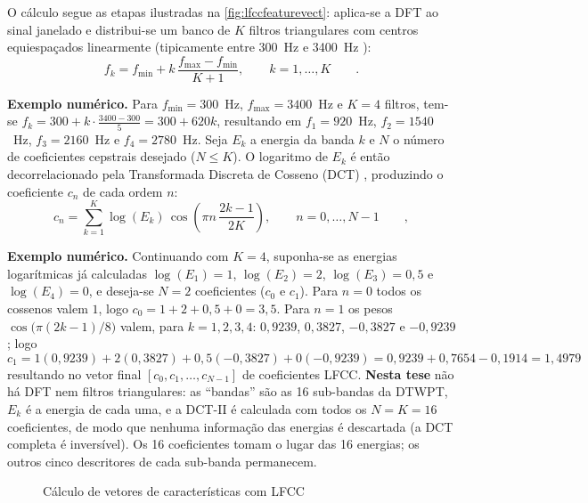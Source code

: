 			\par O cálculo segue as etapas ilustradas na \autoref{fig:lfccfeaturevect}: aplica-se a \ac{DFT} ao sinal janelado e distribui-se um banco de $K$ filtros triangulares com centros equiespaçados linearmente (tipicamente entre 300~Hz e 3400~Hz \cite{zhou2011lfcc}):
			\begin{equation}
				f_k = f_{\min} + k\,\frac{f_{\max} - f_{\min}}{K + 1}, \qquad k = 1, \ldots, K \qquad.
			\end{equation}
			\par \textbf{Exemplo numérico.} Para $f_{\min}=300$~Hz, $f_{\max}=3400$~Hz e $K=4$ filtros, tem-se $f_k = 300 + k\cdot\frac{3400-300}{5} = 300+620k$, resultando em $f_1=920$~Hz, $f_2=1540$~Hz, $f_3=2160$~Hz e $f_4=2780$~Hz.
			Seja $E_k$ a energia da banda $k$ e $N$ o número de coeficientes cepstrais desejado ($N \leqslant K$). O logaritmo de $E_k$ é então decorrelacionado pela Transformada Discreta de Cosseno (DCT) \cite{ali2022speech}, produzindo o coeficiente $c_n$ de cada ordem $n$:
			\begin{equation}
				c_n = \sum_{k=1}^{K} \log(E_k)\,\cos\!\left(\pi n\,\frac{2k-1}{2K}\right), \qquad n = 0, \ldots, N-1 \qquad,
			\end{equation}
			\par \textbf{Exemplo numérico.} Continuando com $K=4$, suponha-se as energias logarítmicas já calculadas $\log(E_1)=1$, $\log(E_2)=2$, $\log(E_3)=0{,}5$ e $\log(E_4)=0$, e deseja-se $N=2$ coeficientes ($c_0$ e $c_1$). Para $n=0$ todos os cossenos valem $1$, logo $c_0 = 1+2+0{,}5+0 = 3{,}5$. Para $n=1$ os pesos $\cos\!\big(\pi(2k-1)/8\big)$ valem, para $k=1,2,3,4$: $0{,}9239$, $0{,}3827$, $-0{,}3827$ e $-0{,}9239$; logo
			\begin{equation*}
				c_1 = 1(0{,}9239) + 2(0{,}3827) + 0{,}5(-0{,}3827) + 0(-0{,}9239) = 0{,}9239+0{,}7654-0{,}1914 = 1{,}4979
			\end{equation*}
			resultando no vetor final $[c_0, c_1, \ldots, c_{N-1}]$ de coeficientes LFCC. \textbf{Nesta tese} não há \ac{DFT} nem filtros triangulares: as ``bandas'' são as 16 sub-bandas da \ac{DTWPT}, $E_k$ é a energia de cada uma, e a DCT-II é calculada com todos os $N = K = 16$ coeficientes, de modo que nenhuma informação das energias é descartada (a DCT completa é inversível). Os 16 coeficientes tomam o lugar das 16 energias; os outros cinco descritores de cada sub-banda permanecem.

			\begin{figure}[h]
				\centering
				\caption{Cálculo de vetores de características com LFCC}
				\resizebox{0.6\linewidth}{!}{}
				\label{fig:lfccfeaturevect}
			\end{figure}

